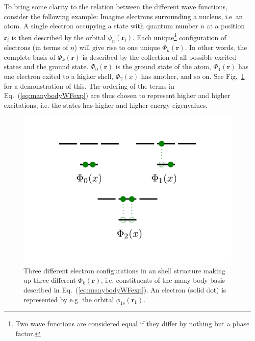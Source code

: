 To bring some clarity to the relation between the different wave functions, consider the following example: Imagine electrons surrounding a nucleus, i.e~an atom. A single electron occupying a state with quantum number $n$ at a position $\mathbf{r}_i$ is then described by the orbital $\phi_n(\mathbf{r}_i)$. Each unique\footnote{Two wave functions are considered equal if they differ by nothing but a phase factor.} configuration of electrons (in terms of $n$) will give rise to one unique $\Phi_k(\mathbf{r})$. In other words, the complete basis of $\Phi_k(\mathbf{r})$ is described by the collection of all possible excited states and the ground state. $\Phi_0(\mathbf{r})$ is the ground state of the atom, $\Phi_1(\mathbf{r})$ has one electron exited to a higher shell, $\Phi_2(x)$ has another, and so on. See Fig.~\ref{fig:AtomicOrbitals} for a demonstration of this. The ordering of the terms in Eq.~(\ref{eq:manybodyWFexp}) are thus chosen to represent higher and higher excitations, i.e. the states has higher and higher energy eigenvalues.

\begin{figure}
 \begin{center}
  \includegraphics[scale=0.5]{../Graphics/shellStructure.pdf}
  \caption{Three different electron configurations in an shell structure making up three different $\Phi_k(\mathbf{r})$, i.e. constituents of the many-body basis described in Eq.~(\ref{eq:manybodyWFexp}). An electron (solid dot) is represented by e.g. the orbital $\phi_{1s}(\mathbf{r}_1)$.}
  \label{fig:AtomicOrbitals}
 \end{center}
\end{figure}

